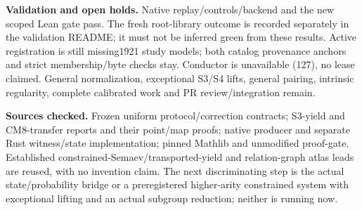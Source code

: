 \documentclass[10pt]{article}
\begin{document}
\textbf{Validation and open holds.} Native replay/controls/backend and the new
scoped Lean gate pass. The fresh root-library outcome is recorded separately in
the validation README; it must not be inferred green from these results. Active
registration is still missing1921 study models; both catalog provenance anchors
and strict membership/byte checks stay. Conductor is unavailable (127), no lease
claimed. General normalization, exceptional S3/S4 lifts, general pairing,
intrinsic regularity, complete calibrated work and PR review/integration remain.

\textbf{Sources checked.} Frozen uniform protocol/correction contracts; S3-yield
and CM8-transfer reports and their point/map proofs; native producer and separate
Rust witness/state implementation; pinned Mathlib and unmodified proof-gate.
Established constrained-Semaev/transported-yield and relation-graph atlas leads
are reused, with no invention claim. The next discriminating step is the actual
state/probability bridge or a preregistered higher-arity constrained system with
exceptional lifting and an actual subgroup reduction; neither is running now.
\end{document}

